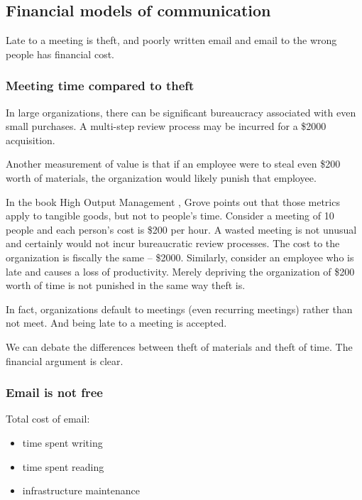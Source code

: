 \subsection{Financial models of communication}

Late to a meeting is theft, and poorly written email and email to the wrong people has financial cost.

\subsubsection{Meeting time compared to theft}

In large organizations, there can be significant bureaucracy associated with even small purchases. A multi-step review process may be incurred for a \$2000 acquisition.

Another measurement of value is that if an employee were to steal even \$200 worth of materials, the organization would likely punish that employee.


In the book High Output Management \cite{1995_Grove}, Grove points out that those metrics apply to tangible goods, but not to people's time. Consider a meeting of 10 people and each person's cost is \$200 per hour. 
A wasted meeting is not unusual and certainly would not incur bureaucratic review processes. The cost to the organization is fiscally the same -- \$2000. Similarly, consider an employee who is late and causes a loss of productivity. Merely depriving the organization of \$200 worth of time is not punished in the same way theft is.

In fact, organizations default to meetings (even recurring meetings) rather than not meet. And being late to a meeting is accepted. 

We can debate the differences between theft of materials and theft of time. The financial argument is clear. 


\subsubsection{Email is not free}

Total cost of email:
\begin{itemize}
    \item time spent writing
    \item time spent reading
    \item infrastructure maintenance
\end{itemize}

